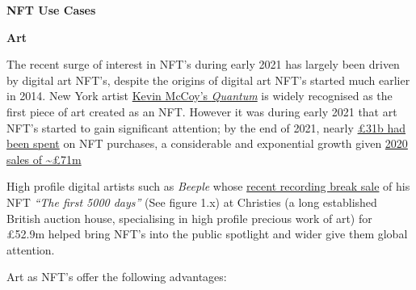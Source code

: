 \textbf{NFT Use Cases}

\textbf{Art}

The recent surge of interest in NFT's during early 2021 has largely been
driven by digital art NFT's, despite the origins of digital art NFT's
started much earlier in 2014. New York artist
\href{https://www.mccoyspace.com/project/125/}{Kevin McCoy's
\emph{Quantum}} is widely recognised as the first piece of art created
as an NFT. However it was during early 2021 that art NFT's started to
gain significant attention; by the end of 2021, nearly
\href{https://www.paymentscardsandmobile.com/state-of-the-blockchain-nfts-explode-onto-scene-in-2021/}{£31b
had been spent} on NFT purchases, a considerable and exponential growth
given
\href{https://raritysniper.com/news/nfts-exploded-in-2021-with-25-billion-in-sales/}{2020
sales of \textasciitilde£71m}

High profile digital artists such as \emph{Beeple} whose
\href{https://www.forbes.com/sites/abrambrown/2021/03/11/beeple-art-sells-for-693-million-becoming-most-expensive-nft-ever/?sh=3f237d1c2448}{recent
recording break sale} of his NFT \emph{``The first 5000 days''} (See
figure 1.x) at Christies (a long established British auction house,
specialising in high profile precious work of art) for £52.9m helped
bring NFT's into the public spotlight and wider give them global
attention.

Art as NFT's offer the following advantages:

